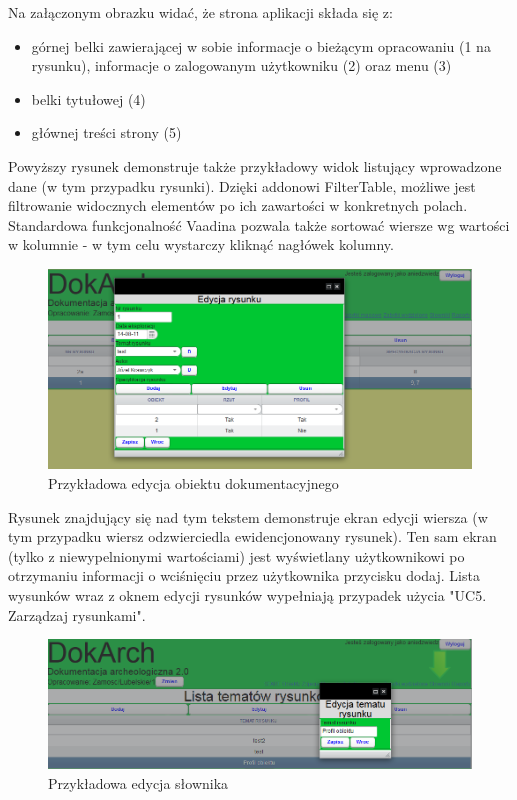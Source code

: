 Na załączonym obrazku widać, że strona aplikacji składa się z:
\begin{itemize}
\item górnej belki zawierającej w sobie informacje o bieżącym opracowaniu (1 na rysunku), informacje o zalogowanym użytkowniku (2) oraz menu (3)
\item belki tytułowej (4)
\item głównej treści strony (5) 
\end{itemize}

Powyższy rysunek demonstruje także przykładowy widok listujący wprowadzone dane (w tym przypadku rysunki). Dzięki addonowi FilterTable, możliwe jest filtrowanie widocznych elementów po ich zawartości w konkretnych polach. Standardowa funkcjonalność Vaadina pozwala także sortować wiersze wg wartości w kolumnie - w tym celu wystarczy kliknąć nagłówek kolumny.

\begin{figure} [H]
    \begin{center}
	\includegraphics[scale=.6]{img/edycja.png}
	\caption{Przykładowa edycja obiektu dokumentacyjnego}
	\label{edycjaPrzyklad}
    \end{center}
\end{figure}

\newpage
Rysunek znajdujący się nad tym tekstem demonstruje ekran edycji wiersza (w tym przypadku wiersz odzwierciedla ewidencjonowany rysunek). Ten sam ekran (tylko z niewypelnionymi wartościami) jest wyświetlany użytkownikowi po otrzymaniu informacji o wciśnięciu przez użytkownika przycisku dodaj. Lista wysunków wraz z oknem edycji rysunków wypełniają przypadek użycia "UC5. Zarządzaj rysunkami".

\begin{figure} [H]
    \begin{center}
	\includegraphics[scale=.6]{img/edycjaSlownika.png}
	\caption{Przykładowa edycja słownika}
	\label{edycjaSlownika}
    \end{center}
\end{figure}

